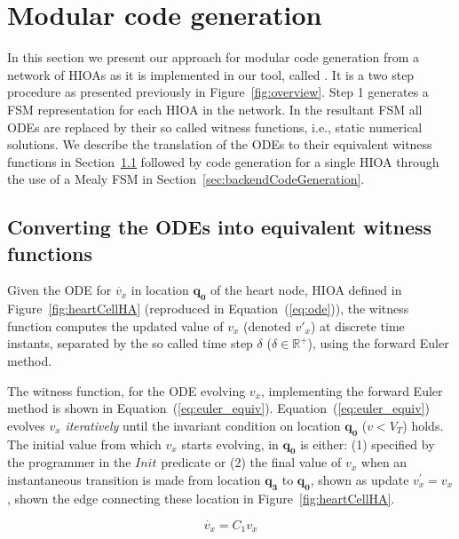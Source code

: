 \section{Modular code generation}
\label{sec:codeGen}

In this section we present our approach for modular code generation from
a network of \acp{HIOA} as it is implemented in our tool, called
\ourTool. It is a two step procedure as presented previously in
Figure~\ref{fig:overview}. Step 1 generates a \ac{FSM} representation
for each \ac{HIOA} in the network. In the resultant \ac{FSM} all
\acp{ODE} are replaced by their so called witness functions, i.e.,
static numerical solutions. We describe the translation of the \acp{ODE}
to their equivalent witness functions in
Section~\ref{sec:converting-odes-into} followed by code generation for a
single \ac{HIOA} through the use of a Mealy \ac{FSM} in
Section~\ref{sec:backendCodeGeneration}.

\subsection{Converting the \acp{ODE} into equivalent witness functions}
\label{sec:converting-odes-into}

Given the \ac{ODE} for $\dot{v_x}$ in location $\mathbf{q_0}$ of the
heart node, \ac{HIOA} defined in Figure~\ref{fig:heartCellHA}
(reproduced in Equation~(\ref{eq:ode})), the witness function computes
the updated value of $v_{x}$ (denoted $v'_{x}$) at discrete time
instants, separated by the so called time step $\delta$
($\delta \in \mathbb{R}^{+}$), using the forward Euler method.  

The witness function, for the \ac{ODE} evolving $v_{x}$, implementing
the forward Euler method is shown in Equation~(\ref{eq:euler_equiv}).
Equation~(\ref{eq:euler_equiv}) evolves $v_{x}$ \emph{iteratively} until
the invariant condition on location $\mathbf{q_{0}}$ ($v < V_{T}$)
holds. The initial value from which $v_{x}$ starts evolving, in
$\mathbf{q_{0}}$ is either: (1) specified by the programmer in the
$Init$ predicate or (2) the final value of $v_{x}$ when an instantaneous
transition is made from location $\mathbf{q_{3}}$ to $\mathbf{q_{0}}$,
shown as update $v^{\prime}_{x} = v_{x}$, shown the edge connecting
these location in Figure~\ref{fig:heartCellHA}.


\begin{equation}
  \dot{v_x} = C_{1} v_x
  \label{eq:ode}
\end{equation}

